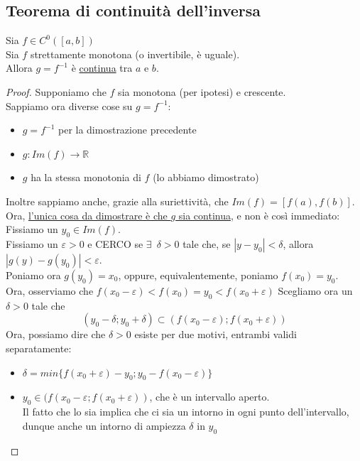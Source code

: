 \documentclass{article}
\theoremstyle{definition}
\begin{document}
\subsection{Teorema di continuità dell'inversa}
Sia $f \in C^0([a,b])$
\\
Sia $f$ strettamente monotona (o invertibile, è uguale).
\\
Allora $g=f^{-1}$ è \underline{continua} tra $a$ e $b$.
\begin{proof}
    Supponiamo che $f$ sia monotona (per ipotesi) e crescente.
    \\
    Sappiamo ora diverse cose su $g=f^{-1}$:
    \begin{itemize}
        \item $g=f^{-1}$ per la dimostrazione precedente
        \item $g : Im(f) \to \mathbb{R}$
        \item $g$ ha la stessa monotonia di $f$ (lo abbiamo dimostrato)
    \end{itemize}
    Inoltre sappiamo anche, grazie alla suriettività, che $Im(f)=[f(a),f(b)]$.
    \\
    Ora, \underline{l'unica cosa da dimostrare è che $g$ sia continua}, e non è così immediato:
    \\
    Fissiamo un $y_0 \in Im(f)$.
    \\
    Fissiamo un $\varepsilon>0$ e CERCO se $\exists \,\,\, \delta>0$ tale che, se $|y-y_0|<\delta$, allora $|g(y)-g(y_0)|<\varepsilon$.
    \\
    Poniamo ora $g(y_0)=x_0$, oppure, equivalentemente, poniamo $f(x_0)=y_0$.
    \\
    Ora, osserviamo che $f(x_0-\varepsilon)<f(x_0)=y_0<f(x_0+\varepsilon)$
Scegliamo ora un $\delta>0$ tale che
\begin{equation}
    (y_0-\delta; y_0+\delta) \subset (f(x_0-\varepsilon);f(x_0+\varepsilon))
\end{equation}
Ora, possiamo dire che $\delta>0$ esiste per due motivi, entrambi validi separatamente:
\begin{itemize}
    \item $\delta =min\{f(x_0+\varepsilon)-y_0;y_0-f(x_0-\varepsilon)\}$
    \item $y_0 \in (f(x_0-\varepsilon;f(x_0+\varepsilon))$, che è un intervallo aperto.
    \\
    Il fatto che lo sia implica che ci sia un intorno in ogni punto dell'intervallo, dunque anche un intorno di ampiezza $\delta$ in $y_0$
\end{itemize}

\end{proof}
\end{document}
